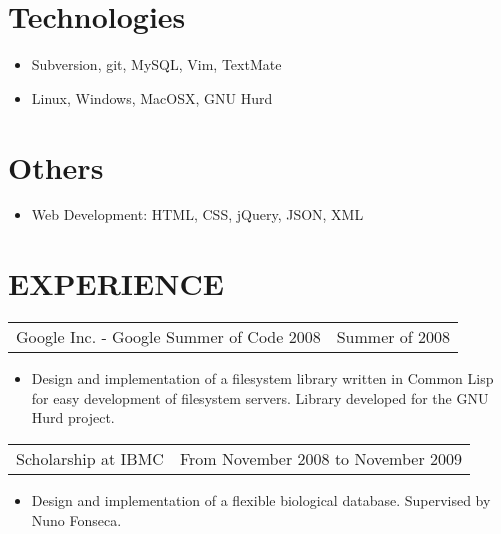 \documentclass[margin]{res}
\begin{document}
\begin{resume}
\normalsize{\section{Technologies}} 
                 \begin{itemize}
                  \item Subversion, git, MySQL, Vim, TextMate
                  \item Linux, Windows, MacOSX, GNU Hurd
                  \end{itemize}
                  
\normalsize{\section{Others}}
              \begin{itemize}
                \item Web Development: HTML, CSS, jQuery, JSON, XML
              \end{itemize}

\section{EXPERIENCE}
            
                  \begin{tabular}{p{3in} r}
                  Google Inc. - Google Summer of Code 2008 & Summer of 2008
                  \end{tabular}	
                   \begin{itemize} %
                    \item[]  Design and implementation of a filesystem library written in Common Lisp for easy development of filesystem servers. Library developed for the GNU Hurd project. 
		   \end{itemize} 
		   
		 \begin{tabular}{p{3in} r}
                  Scholarship at IBMC &  From November 2008 to November 2009 
                 \end{tabular}
		  \begin{itemize}
                   \item[] Design and implementation of a flexible biological database. Supervised by Nuno Fonseca.
                  \end{itemize}
                  

\end{resume}
\end{document}
